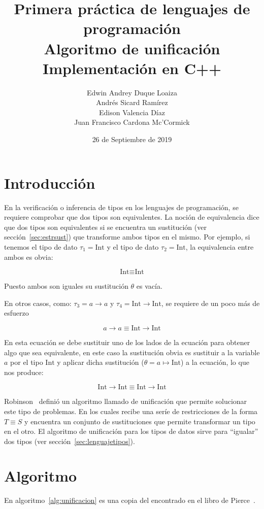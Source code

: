 \documentclass{article}
\title{Primera práctica de lenguajes de programación\\Algoritmo de unificación\\Implementación en C++}
\date{26 de Septiembre de 2019}
\author{Edwin Andrey Duque Loaiza\\Andrés Sicard Ramírez\\Edison Valencia Díaz\\Juan Francisco Cardona Mc'Cormick}
\begin{document}
\maketitle{}

\section{Introducción}
\label{sec:Introduccion}

En la verificación o inferencia de tipos en los lenguajes de
programación, se requiere comprobar que dos tipos son equivalentes. La
noción de equivalencia dice que dos tipos son equivalentes si se
encuentra un sustitución (ver sección~\ref{sec:estrsust}) que
transforme ambos tipos en el mismo. Por ejemplo, si tenemos el tipo de
dato $\tau_1 = \text{Int}$ y el tipo de dato $\tau_2 = \text{Int}$, la
equivalencia entre ambos es obvia:

\[
  \text{Int} \equiv \text{Int}
\]

Puesto ambos son iguales su sustitución $\theta$ es vacía.

En otros casos, como: $\tau_3 = a \to a$ y $\tau_4 = \text{Int}
\to \text{Int}$, se requiere de un poco más de esfuerzo

\[
  a \to a \equiv \text{Int} \to \text{Int}
\]

En esta ecuación se debe sustituir uno de los lados de la ecuación
para obtener algo que sea equivalente, en este caso la sustitución
obvia es sustituir a la variable $a$ por el tipo $\text{Int}$ y
aplicar dicha sustitución ($\theta = a \mapsto \text{Int}$) a la
ecuación, lo que nos produce:

\[
  \text{Int} \to \text{Int} \equiv \text{Int} \to \text{Int}
\]

Robinson~\cite{robinson} definió un algoritmo llamado de unificación
que permite solucionar este tipo de problemas. En los cuales recibe
una seríe de restricciones de la forma $T \equiv S$ y encuentra un
conjunto de sustituciones que permite transformar un tipo en el
otro. El algoritmo de unificación para los tipos de datos sirve para
``igualar'' dos tipos (ver sección~\ref{sec:lenguajetipos}).

\section{Algoritmo}\label{sec:algoritmo}

En algoritmo~\ref{alg:unificacion} es una copia del encontrado en el
libro de Pierce~\cite{pierce}.
\end{document}
